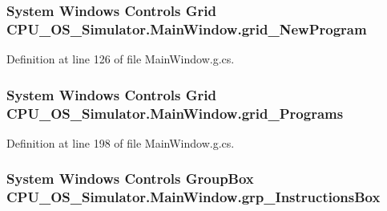 \subsubsection[{grid\+\_\+\+New\+Program}]{\setlength{\rightskip}{0pt plus 5cm}System Windows Controls Grid C\+P\+U\+\_\+\+O\+S\+\_\+\+Simulator.\+Main\+Window.\+grid\+\_\+\+New\+Program\hspace{0.3cm}{\ttfamily [package]}}\label{class_c_p_u___o_s___simulator_1_1_main_window_a38bef5fa03edcca52fa7fc11068923bd}


Definition at line 126 of file Main\+Window.\+g.\+cs.

\hypertarget{class_c_p_u___o_s___simulator_1_1_main_window_a7a4cb93db4cde3b227cbc3155af574d2}{}
\subsubsection[{grid\+\_\+\+Programs}]{\setlength{\rightskip}{0pt plus 5cm}System Windows Controls Grid C\+P\+U\+\_\+\+O\+S\+\_\+\+Simulator.\+Main\+Window.\+grid\+\_\+\+Programs\hspace{0.3cm}{\ttfamily [package]}}\label{class_c_p_u___o_s___simulator_1_1_main_window_a7a4cb93db4cde3b227cbc3155af574d2}


Definition at line 198 of file Main\+Window.\+g.\+cs.

\hypertarget{class_c_p_u___o_s___simulator_1_1_main_window_aebc1256b654d001b7c4ce2bc08522667}{}
\subsubsection[{grp\+\_\+\+Instructions\+Box}]{\setlength{\rightskip}{0pt plus 5cm}System Windows Controls Group\+Box C\+P\+U\+\_\+\+O\+S\+\_\+\+Simulator.\+Main\+Window.\+grp\+\_\+\+Instructions\+Box\hspace{0.3cm}{\ttfamily [package]}}\label{class_c_p_u___o_s___simulator_1_1_main_window_aebc1256b654d001b7c4ce2bc08522667}


